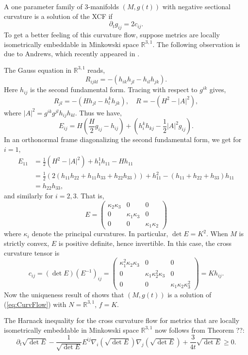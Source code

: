 A one parameter family of 3-manifolds $(M,g(t))$ with negative sectional curvature is a solution of the XCF if
\[\partial_tg_{ij}=2c_{ij}.\]
To get a better feeling of this curvature flow, suppose metrics are locally isometrically embeddable in Minkowski space $\mathbb{R}^{3,1}$. The following observation is due to Andrews, which recently appeared in \cite{AndrewsChenFangMcCoy:/2015}. 

The Gauss equation in $\mathbb{R}^{3,1}$ reads,
\[
R_{ijkl} = -(h_{ik}h_{jl} - h_{il}h_{jk}).
\]
Here $h_{ij}$ is the second fundamental form. Tracing with respect to $g^{ik}$ gives,
\[
R_{jl} = -(Hh_{jl} - h^k_lh_{jk}), \quad R = -(H^2 - |A|^2),
\]
where $|A|^2=g^{ik}g^{jl}h_{ij}h_{kl}.$
Thus we have,
\[
E_{ij} = H\left(\frac{H}{2}g_{ij} - h_{ij}\right) + \left(h^k_ih_{kj} - \frac{1}{2}|A|^2g_{ij}\right).
\]
In an orthonormal frame diagonalizing the second fundamental form, we get for $i=1$,
\[
\begin{split}
E_{11} &= \frac{1}{2}\left(H^2 - |A|^2\right) + h^1_1 h_{11} - Hh_{11} \\
&= \frac{1}{2}\left(2(h_{11}h_{22} + h_{11}h_{33} + h_{22}h_{33})\right) + h_{11}^2 - \left(h_{11} + h_{22} + h_{33}\right) h_{11} \\
&= h_{22}h_{33},
\end{split}
\]
and similarly for $i=2,3$. That is,
\[
E = \begin{pmatrix}
\kappa_2 \kappa_3 & 0 & 0 \\
0 & \kappa_1\kappa_3 & 0 \\
0 & 0 & \kappa_1\kappa_2
\end{pmatrix}
\]
where $\kappa_i$ denote the principal curvatures. In particular, $\det E = K^2.$ When $M$ is strictly convex, $E$ is positive definite, hence invertible. In this case, the cross curvature tensor is
\[
c_{ij} = ({\det} E) (E^{-1})_{ij} = \begin{pmatrix}
\kappa_1^2 \kappa_2 \kappa_3 & 0 & 0 \\
0 & \kappa_1\kappa_2^2 \kappa_3 & 0 \\
0 & 0 & \kappa_1\kappa_2\kappa_3^2
\end{pmatrix} = Kh_{ij}.
\]
Now the uniqueness result of \cite{Buckland:/2006} shows that $(M,g(t))$ is a solution of (\ref{eq:CurvFlow}) with $N=\mathbb{R}^{3,1}$, $f=K$. 

The Harnack inequality for the cross curvature flow for metrics that are locally isometrically embeddable in Minkowski space $\mathbb{R}^{3,1}$ now follows from Theorem ??:
\[
\partial_t \sqrt{{\det} E} - \frac{1}{\sqrt{{\det}E}}E^{ij} \nabla_i \left(\sqrt{{\det}E}\right) \nabla_j \left(\sqrt{{\det}E}\right) + \frac{3}{4 t} \sqrt{{\det}E} \geq 0.
\]





